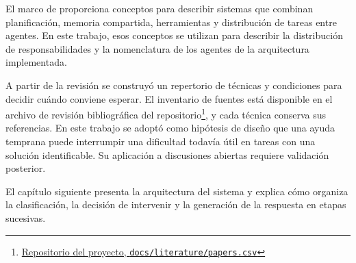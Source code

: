 El marco de \textcite{DwivediEtAl2026} proporciona conceptos para describir sistemas que combinan planificación, memoria compartida, herramientas y distribución de tareas entre agentes. En este trabajo, esos conceptos se utilizan para describir la distribución de responsabilidades y la nomenclatura de los agentes de la arquitectura implementada.

A partir de la revisión se construyó un repertorio de técnicas y condiciones para decidir cuándo conviene esperar. El inventario de fuentes está disponible en el archivo de revisión bibliográfica del repositorio\footnote{\href{https://github.com/magrimal/tfm-2026-discussion-moderation/blob/main/docs/literature/papers.csv}{Repositorio del proyecto, \texttt{docs/literature/papers.csv}}}, y cada técnica conserva sus referencias. En este trabajo se adoptó como hipótesis de diseño que una ayuda temprana puede interrumpir una dificultad todavía útil en tareas con una solución identificable. Su aplicación a discusiones abiertas requiere validación posterior.

El capítulo siguiente presenta la arquitectura del sistema y explica cómo organiza la clasificación, la decisión de intervenir y la generación de la respuesta en etapas sucesivas.
